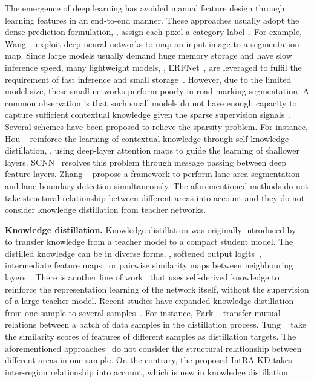 \documentclass[10pt,twocolumn,letterpaper]{article}
\begin{document}
The emergence of deep learning has avoided manual feature design through learning features in an end-to-end manner. These approaches usually adopt the dense prediction formulation, \ie, assign each pixel a category label~\cite{hou2019learning, pan2017spatial, wang2019apolloscape}. For example, Wang \etal ~\cite{wang2019apolloscape} exploit deep neural networks to map an input image to a segmentation map. Since large models usually demand huge memory storage and have slow inference speed, many lightweight models, \eg, ERFNet~\cite{romera2017erfnet}, are leveraged to fulfil the requirement of fast inference and small storage~\cite{hou2019learning}. However, due to the limited model size, these small networks perform poorly in road marking segmentation. A common observation is that such small models do not have enough capacity to capture sufficient contextual knowledge given the sparse supervision signals~\cite{hou2019learning,pan2017spatial,zhang2018geometric}. Several schemes have been proposed to relieve the sparsity problem. For instance, Hou \etal ~\cite{hou2019learning} reinforce the learning of contextual knowledge through self knowledge distillation, \ie, using deep-layer attention maps to guide the learning of shallower layers. SCNN~\cite{pan2017spatial} resolves this problem through message passing between deep feature layers. Zhang \etal ~\cite{zhang2018geometric} propose a framework to perform lane area segmentation and lane boundary detection simultaneously. 
The aforementioned methods do not take structural relationship between different areas into account and they do not consider knowledge distillation from teacher networks. 

\noindent \textbf{Knowledge distillation.} Knowledge distillation was originally introduced by~\cite{hinton2015distilling} to transfer knowledge from a teacher model to a compact student model. The distilled knowledge can be in diverse forms, \eg, softened output logits~\cite{hinton2015distilling}, intermediate feature maps~\cite{gao2018embarrassingly, hou2019learningto, liu2019structured, zhu2018bidirectional} or pairwise similarity maps between neighbouring layers~\cite{yim2017gift}. There is another line of work~\cite{hou2019learning, sun2019deeply} that uses self-derived knowledge to reinforce the representation learning of the network itself, without the supervision of a large teacher model. Recent studies have expanded knowledge distillation from one sample to several samples~\cite{liu2019knowledge, park2019relational, peng2019correlation, tung2019similarity}. For instance, Park \etal ~\cite{park2019relational} transfer mutual relations between a batch of data samples in the distillation process. Tung \etal ~\cite{tung2019similarity} take the similarity scores of features of different samples as distillation targets. The aforementioned approaches~\cite{liu2019knowledge, park2019relational, peng2019correlation, tung2019similarity} do not consider the structural relationship between different areas in one sample. On the contrary, the proposed IntRA-KD takes inter-region relationship into account, which is new in knowledge distillation.  
\end{document}
